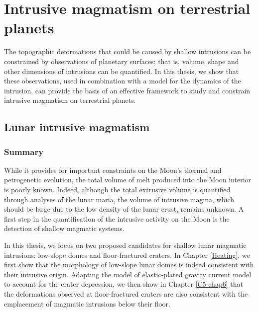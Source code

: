 \chapter{Intrusive magmatism on terrestrial planets}
\label{chap8}

The  topographic   deformations  that  could  be   caused  by  shallow
intrusions can  be constrained by observations  of planetary surfaces;
that  is, volume,  shape and  other  dimensions of  intrusions can  be
quantified. In this  thesis, we show that these  observations, used in
combination  with a  model  for  the dynamics  of  the intrusion,  can
provide the  basis of  an effective framework  to study  and constrain
intrusive magmatism on terrestrial planets.

\section{Lunar intrusive magmatism}
\label{sec:terr-intr-magm}

\subsection{Summary}
\label{sec:summary}

While it provides for important  constraints on the Moon's thermal and
petrogenetic evolution,  the total  volume of  melt produced  into the
Moon interior is  poorly known.  Indeed, although  the total extrusive
volume is quantified  through analyses of the lunar  maria, the volume
of intrusive  magma, which should be  large due to the  low density of
the lunar crust,  remains unknown. A first step  in the quantification
of the  intrusive activity  on the  Moon is  the detection  of shallow
magmatic systems.

In this thesis, we focus on  two proposed candidates for shallow lunar
magmatic intrusions:  low-slope domes and floor-fractured  craters. In
Chapter \ref{Heating}, we first show  that the morphology of low-slope
lunar  domes  is  indeed   consistent  with  their  intrusive  origin.
Adapting the model of elastic-plated  gravity current model to account
for the crater depression, we then show in Chapter \ref{C5-chap6} that
the  deformations   observed  at  floor-fractured  craters   are  also
consistent  with the  emplacement of  magmatic intrusions  below their
floor.

